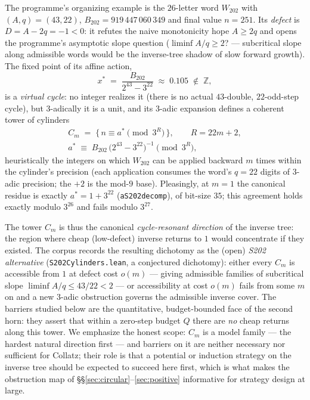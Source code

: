 \documentclass[11pt]{amsart}
\theoremstyle{definition}
\theoremstyle{remark}
\newcommand{\lean}[1]{{\def\_{\textunderscore\allowbreak}\texttt{#1}}}
\newcommand{\Z}{\mathbb{Z}}
\begin{document}
The programme's organizing example is the $26$-letter word $W_{202}$ with
$(A, q) = (43, 22)$, $B_{202} = 919\,447\,060\,349$ and final value
$n = 251$.  Its \emph{defect} is $D = A - 2q = -1 < 0$: it refutes the naive
monotonicity hope $A \ge 2q$ and opens the programme's asymptotic slope
question ($\liminf A/q \ge 2$?  --- subcritical slope along admissible words
would be the inverse-tree shadow of slow forward growth).  The fixed point of
its affine action,
\[
x^{*} \;=\; \frac{B_{202}}{2^{43} - 3^{22}} \;\approx\; 0.105 \;\notin\; \Z,
\]
is a \emph{virtual cycle}: no integer realizes it (there is no actual
$43$-double, $22$-odd-step cycle), but $3$-adically it is a unit, and its
$3$-adic expansion defines a coherent tower of cylinders
\begin{gather*}
C_m \;=\; \{\, n \equiv a^{*} \pmod{3^{R}}\,\},\qquad R = 22m+2,\\
a^{*} \;\equiv\; B_{202}\,\bigl(2^{43}-3^{22}\bigr)^{-1} \pmod{3^{R}},
\end{gather*}
heuristically the integers on which $W_{202}$ can be applied backward $m$
times within the cylinder's precision (each application consumes the word's
$q = 22$ digits of $3$-adic precision; the $+2$ is the mod-$9$ base).
Pleasingly, at $m=1$ the canonical residue is exactly $a^{*} = 1 + 3^{22}$
(\lean{aS202\_decomp}), of bit-size $35$; this agreement holds exactly modulo
$3^{26}$ and fails modulo $3^{27}$.

The tower $C_m$ is thus the canonical \emph{cycle-resonant direction} of the
inverse tree: the region where cheap (low-defect) inverse returns to $1$
would concentrate if they existed.  The corpus records the resulting
dichotomy as the (open) \emph{S202 alternative}
(\lean{S202Cylinders.lean}, a conjectured dichotomy): either every $C_m$ is
accessible from $1$ at defect cost $o(m)$ --- giving admissible families of
subcritical slope $\liminf A/q \le 43/22 < 2$ --- or accessibility at cost
$o(m)$ fails from some $m$ on and a new $3$-adic obstruction governs the
admissible inverse cover.  The barriers studied below are the quantitative,
budget-bounded face of the second horn: they assert that within a zero-step
budget $Q$ there are \emph{no} cheap returns along this tower.  We emphasize
the honest scope: $C_m$ is a model family --- the hardest natural direction
first --- and barriers on it are neither necessary nor sufficient for
Collatz; their role is that a potential or induction strategy on the inverse
tree should be expected to succeed here first, which is what makes the
obstruction map of \S\S\ref{sec:circular}--\ref{sec:positive} informative
for strategy design at large.
\end{document}
